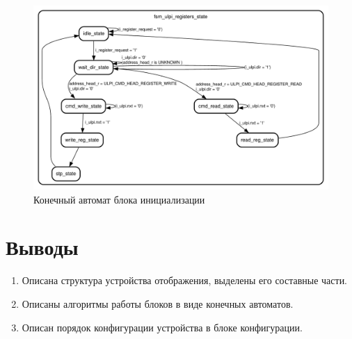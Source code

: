 \begin{figure}[ht]
    \centering
    \includegraphics[scale=0.6]{res/img/fsm_ulpi_registers_state.pdf}
    \caption{Конечный автомат блока инициализации}
    \label{fig:fsm_ulpi_registers_state}
\end{figure}

\section{Выводы}

\begin{enumerate}
\item Описана структура устройства отображения, выделены его составные части.
\item Описаны алгоритмы работы блоков в виде конечных автоматов.
\item Описан порядок конфигурации устройства в блоке конфигурации.
\end{enumerate}
